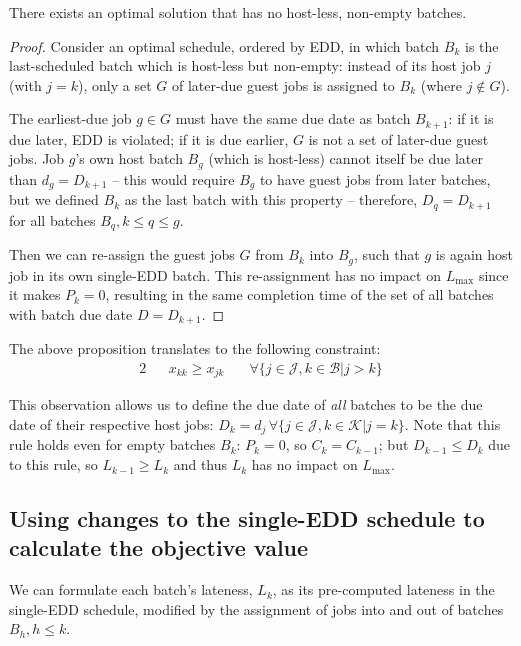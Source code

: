 \documentclass[oribibl]{llncs}
\def\Lmax{{L_{\mathrm{max}}}}
\begin{document}
\begin{proposition}\label{prop:nohostless}
There exists an optimal solution that has no host-less, non-empty batches.
\end{proposition}
\begin{proof}
Consider an optimal schedule, ordered by EDD, in which batch $B_k$ is the
last-scheduled batch which is host-less but non-empty: instead of its host job
$j$ (with $j=k$), only a set $G$ of later-due guest jobs is assigned
to $B_k$ (where $j \notin G$).

The earliest-due job $g \in G$ must have the same due date as batch
$B_{k+1}$: if it is due later, EDD is violated; if it is due earlier,
$G$ is not a set of later-due guest jobs. Job $g$'s own host batch $B_g$
(which is host-less) cannot itself be due later than $d_g = D_{k+1}$ --
this would require $B_g$ to have guest jobs from later batches, but we
defined $B_k$ as the last batch with this property -- therefore, $D_q =
D_{k+1}$ for all batches $B_q, k \leq q \leq g$.

Then we can re-assign the guest jobs $G$ from $B_k$ into $B_g$,
such that $g$ is again host job in its own single-EDD batch. This
re-assignment has no impact on $\Lmax$ since it makes $P_k = 0$,
resulting in the same completion time of the set of all batches with
batch due date $D = D_{k+1}$.
\end{proof}

The above proposition translates to the following constraint:
\begin{alignat}{2}
  && x_{kk} \geq x_{jk} \quad & \forall\{j \in \mathcal{J}, k \in \mathcal{B} |
j> k\}
\end{alignat}

This observation allows us to define the due date of \emph{all} batches
to be the due date of their respective host jobs: $D_k = d_j\,\forall\{j
\in \mathcal{J}, k \in \mathcal{K}|j=k\}$. Note that this rule holds
even for empty batches $B_k$: $P_k = 0$, so $C_k = C_{k-1}$; but
$D_{k-1} \leq D_k$ due to this rule, so $L_{k-1} \geq L_k$ and thus
$L_k$ has no impact on $\Lmax$.

\subsection{Using changes to the single-EDD schedule to calculate the objective value}
\label{sec:moves}

We can formulate each batch's lateness, $L_k$, as its pre-computed
lateness in the single-EDD schedule, modified by the assignment of jobs into and
out of batches $B_h, h \leq k$. 
\end{document}
